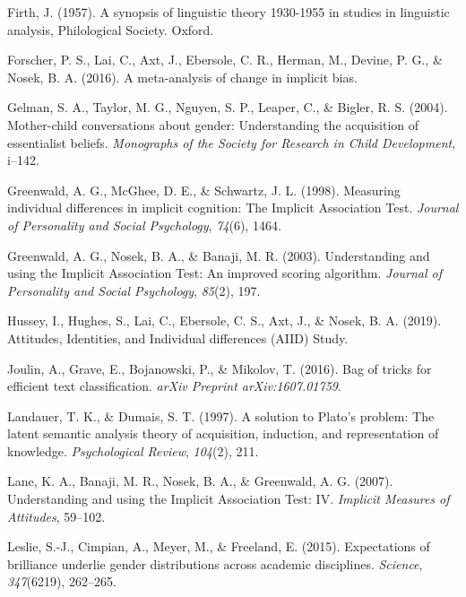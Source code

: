 \documentclass[man,floatsintext]{apa6}
\begin{document}
\leavevmode\hypertarget{ref-firth1957synopsis}{}%
Firth, J. (1957). A synopsis of linguistic theory 1930-1955 in studies in linguistic analysis, Philological Society. Oxford.

\leavevmode\hypertarget{ref-forscher2016meta}{}%
Forscher, P. S., Lai, C., Axt, J., Ebersole, C. R., Herman, M., Devine, P. G., \& Nosek, B. A. (2016). A meta-analysis of change in implicit bias.

\leavevmode\hypertarget{ref-gelman2004mother}{}%
Gelman, S. A., Taylor, M. G., Nguyen, S. P., Leaper, C., \& Bigler, R. S. (2004). Mother-child conversations about gender: Understanding the acquisition of essentialist beliefs. \emph{Monographs of the Society for Research in Child Development}, i--142.

\leavevmode\hypertarget{ref-greenwald1998measuring}{}%
Greenwald, A. G., McGhee, D. E., \& Schwartz, J. L. (1998). Measuring individual differences in implicit cognition: The Implicit Association Test. \emph{Journal of Personality and Social Psychology}, \emph{74}(6), 1464.

\leavevmode\hypertarget{ref-greenwald2003understanding}{}%
Greenwald, A. G., Nosek, B. A., \& Banaji, M. R. (2003). Understanding and using the Implicit Association Test: An improved scoring algorithm. \emph{Journal of Personality and Social Psychology}, \emph{85}(2), 197.

\leavevmode\hypertarget{ref-aiid}{}%
Hussey, I., Hughes, S., Lai, C., Ebersole, C. S., Axt, J., \& Nosek, B. A. (2019). Attitudes, Identities, and Individual differences (AIID) Study.

\leavevmode\hypertarget{ref-joulin2016bag}{}%
Joulin, A., Grave, E., Bojanowski, P., \& Mikolov, T. (2016). Bag of tricks for efficient text classification. \emph{arXiv Preprint arXiv:1607.01759}.

\leavevmode\hypertarget{ref-landauer1997solution}{}%
Landauer, T. K., \& Dumais, S. T. (1997). A solution to Plato's problem: The latent semantic analysis theory of acquisition, induction, and representation of knowledge. \emph{Psychological Review}, \emph{104}(2), 211.

\leavevmode\hypertarget{ref-lane2007understanding}{}%
Lane, K. A., Banaji, M. R., Nosek, B. A., \& Greenwald, A. G. (2007). Understanding and using the Implicit Association Test: IV. \emph{Implicit Measures of Attitudes}, 59--102.

\leavevmode\hypertarget{ref-leslie2015expectations}{}%
Leslie, S.-J., Cimpian, A., Meyer, M., \& Freeland, E. (2015). Expectations of brilliance underlie gender distributions across academic disciplines. \emph{Science}, \emph{347}(6219), 262--265.
\end{document}

